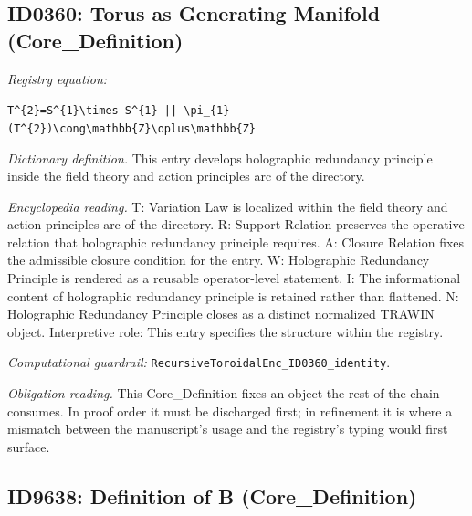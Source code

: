 \documentclass[11pt]{article}
\theoremstyle{remark}
\begin{document}
\subsection{ID0360: Torus as Generating Manifold (Core\_Definition)}

\noindent\textit{Registry equation:}\par
{\small\texttt{T\textasciicircum{}\{2\}=S\textasciicircum{}\{1\}\textbackslash{}times S\textasciicircum{}\{1\} || \textbackslash{}pi\_\{1\}(T\textasciicircum{}\{2\})\textbackslash{}cong\textbackslash{}mathbb\{Z\}\textbackslash{}oplus\textbackslash{}mathbb\{Z\}}}\par\medskip
\noindent\textit{Dictionary definition.} This entry develops holographic redundancy principle inside the field theory and action principles arc of the directory.\par\medskip
\noindent\textit{Encyclopedia reading.} T: Variation Law is localized within the field theory and action principles arc of the directory. R: Support Relation preserves the operative relation that holographic redundancy principle requires. A: Closure Relation fixes the admissible closure condition for the entry. W: Holographic Redundancy Principle is rendered as a reusable operator-level statement. I: The informational content of holographic redundancy principle is retained rather than flattened. N: Holographic Redundancy Principle closes as a distinct normalized TRAWIN object. Interpretive role: This entry specifies the structure within the registry.
\par\medskip\noindent\textit{Computational guardrail:} \texttt{RecursiveToroidalEnc\_ID0360\_identity}.
\par\medskip\noindent\textit{Obligation reading.} This Core\_Definition fixes an object the rest of the chain consumes. In proof order it must be discharged first; in refinement it is where a mismatch between the manuscript's usage and the registry's typing would first surface.

\subsection{ID9638: Definition of B (Core\_Definition)}
\end{document}
